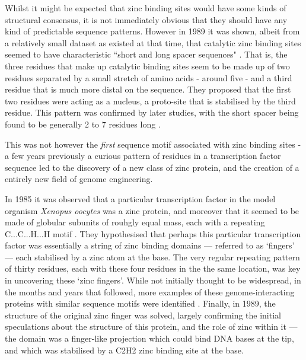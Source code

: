 Whilst it might be expected that zinc binding sites would have some kinds of structural consensus, it is not immediately obvious that they should have any kind of predictable sequence patterns. However in 1989 it was shown, albeit from a relatively small dataset as existed at that time, that catalytic zinc binding sites seemed to have characteristic ``short and long spacer sequences" \cite{vallee1989short}. That is, the three residues that make up catalytic binding sites seem to be made up of two residues separated by a small stretch of amino acids - around five - and a third residue that is much more distal on the sequence. They proposed that the first two residues were acting as a nucleus, a proto-site that is stabilised by the third residue. This pattern was confirmed by later studies, with the short spacer being found to be generally 2 to 7 residues long \cite{patel2007analysis}.

This was not however the \textit{first} sequence motif associated with zinc binding sites - a few years previously a curious pattern of residues in a transcription factor sequence led to the discovery of a new class of zinc protein, and the creation of a entirely new field of genome engineering.

In 1985 it was observed that a particular transcription factor in the model organism \emph{Xenopus oocytes} was a zinc protein, and moreover that it seemed to be made of globular subunits of rouhgly equal mass, each with a repeating C...C...H...H motif \cite{miller1985repetitive}. They hypothesised that perhaps this particular transcription factor was essentially a string of zinc binding domains --- referred to as `fingers' --- each stabilised by a zinc atom at the base. The very regular repeating pattern of thirty residues, each with these four residues in the the same location, was key in uncovering these `zinc fingers'. While not initially thought to be widespread, in the months and years that followed, more examples of these genome-interacting proteins with similar sequence motifs were identified \cite{payre1988finger}. Finally, in 1989, the structure of the original zinc finger was solved, largely confirming the initial speculations about the structure of this protein, and the role of zinc within it --- the domain was a finger-like projection which could bind DNA bases at the tip, and which was stabilised by a C2H2 zinc binding site at the base.

